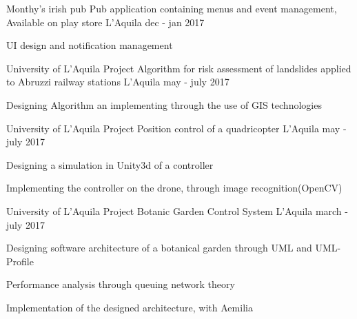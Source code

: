 


\begin{cventries}


\cventry
{Monthy's irish pub}%
{Pub application containing menus and event management,  Available on play store} %
{L'Aquila} %
{dec - jan 2017} %
{ %
	\begin{cvitems}
		\item {UI design and notification management }
	\end{cvitems}
}



\cventry
{University of L'Aquila Project}%
{Algorithm for risk assessment of landslides applied to Abruzzi railway stations} %
{L'Aquila} %
{may - july 2017} %
{ %
	\begin{cvitems}
		\item {Designing Algorithm an implementing through the use of GIS technologies}
	\end{cvitems}
}

\cventry
{University of L'Aquila Project}%
{Position control of a quadricopter} %
{L'Aquila} %
{may - july 2017} %
{ %
	\begin{cvitems}
		\item {Designing a simulation in Unity3d of a controller}
		\item {Implementing the controller on the drone, through image recognition(OpenCV)}
	\end{cvitems}
}

\cventry
{University of L'Aquila Project} %
{Botanic Garden Control System} %
{L'Aquila} %
{march - july 2017} %
{ %
	\begin{cvitems}
		\item {Designing software architecture of a botanical garden through UML and UML-Profile}
		\item {Performance analysis through queuing network theory}
		\item {Implementation of the designed architecture, with Aemilia}
	\end{cvitems}
}


\end{cventries}
